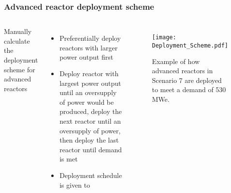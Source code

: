 \begin{frame}
    \frametitle{Advanced reactor deployment scheme}
    \begin{columns}
        \column[t]{5cm}
            Manually calculate the deployment scheme for advanced reactors
            \begin{itemize}
                \item Preferentially deploy reactors with larger power output first
                \item Deploy reactor with largest power output until an oversupply 
                      of power would be produced, deploy the next reactor until 
                      an oversupply of power, then deploy the last reactor until 
                      demand is met
                \item Deployment schedule is given to \Cyclus
            \end{itemize}
        \column[t]{5.5cm}
            \begin{figure}
                \texttt{[image: Deployment\_Scheme.pdf]}
                \caption{Example of how advanced reactors in Scenario 7 are deployed to 
                meet a demand of 530 MWe.}
                \label{fig:deployment}
            \end{figure}
                    
    \end{columns}
\end{frame}